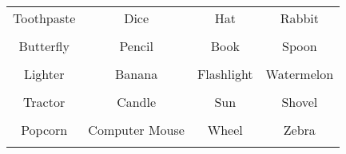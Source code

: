 \documentclass[12pt,a4paper]{article}
\begin{document}
\thispagestyle{empty}
\begin{table}[]
\centering
\Huge
\begin{tabular}{cccc}
 Toothpaste& Dice& Hat& Rabbit\\  & & & \\
 Butterfly& Pencil& Book& Spoon\\  & & & \\
 Lighter& Banana& Flashlight& Watermelon\\  & & & \\
 Tractor& Candle& Sun& Shovel\\  & & & \\
 Popcorn& Computer Mouse& Wheel& Zebra\\  & & & \\
\end{tabular}
\end{table}
\end{document}
